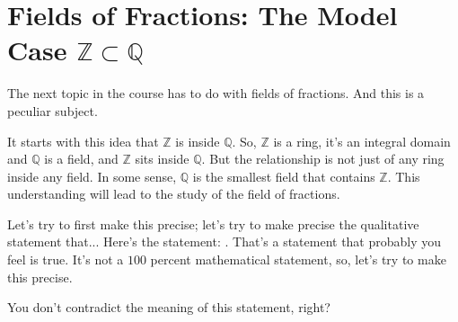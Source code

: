 \section{Fields of Fractions: The Model Case \texorpdfstring{$\mathbb{Z} \subset \mathbb{Q}$}{Z in Q}}

\begin{speech}[00:13:48 - 00:15:30]
The next topic in the course has to do with fields of fractions.  And this is a peculiar subject.

It starts with this idea that $\mathbb{Z}$ is inside $\mathbb{Q}$.  So, $\mathbb{Z}$ is a ring, it's an integral domain  and $\mathbb{Q}$ is a field,  and $\mathbb{Z}$ sits inside $\mathbb{Q}$. But the relationship is not just of any ring inside any field. In some sense, $\mathbb{Q}$ is the smallest field that contains $\mathbb{Z}$. This understanding will lead to the study of the field of fractions.

Let's try to first make this precise; let's try to make precise the qualitative statement that...  Here's the statement: . That's a statement that probably you feel is true. It's not a $100$ percent mathematical statement, so, let's try to make this precise.

You don't contradict the meaning of this statement, right?
\end{speech}

